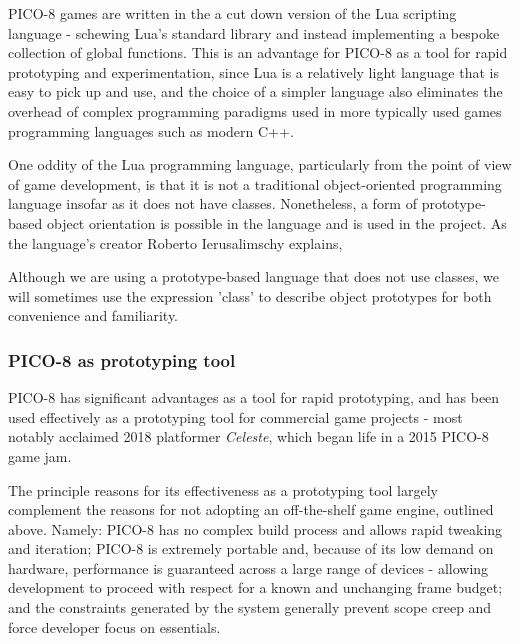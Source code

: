 \documentclass[11pt]{article}
\begin{document}
PICO-8 games are written in the a cut down version of the Lua scripting language -
schewing Lua's standard library and instead implementing a bespoke collection of
global functions. This is an advantage for PICO-8 as a tool for rapid prototyping and
experimentation, since Lua is a relatively light language that is easy to pick up and
use, and the choice of a simpler language also eliminates the overhead of complex
programming paradigms used in more typically used games programming languages such as
modern C++.

One oddity of the Lua programming language, particularly from the point of view of
game development, is that it is not a traditional object-oriented programming language
insofar as it does not have classes. Nonetheless, a form of prototype-based object orientation
is possible in the language and is used in the project. As the language's creator Roberto Ierusalimschy
explains\cite[p. 151]{ierusalimschy}, 

Although we are using a prototype-based language that does not use classes, we will sometimes
use the expression 'class' to describe object prototypes for both convenience and familiarity.

\subsubsection*{PICO-8 as prototyping tool}

PICO-8 has significant advantages as a tool for rapid prototyping, and has been used
effectively as a prototyping tool for commercial game projects - most notably
acclaimed 2018 platformer \textit{Celeste}, which began life in a 2015 PICO-8 game jam.

The principle reasons for its effectiveness as a prototyping tool largely complement the
reasons for not adopting an off-the-shelf game engine, outlined above. Namely: PICO-8
has no complex build process and allows rapid tweaking and iteration; PICO-8 is extremely
portable and, because of its low demand on hardware, performance is guaranteed across a large
range of devices - allowing development to proceed with respect for a known and unchanging
frame budget; and the constraints generated by the system generally prevent scope creep and force
developer focus on essentials.
\end{document}
